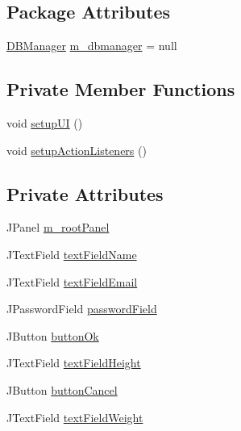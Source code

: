 \subsection*{Package Attributes}
\begin{DoxyCompactItemize}
\item 
\mbox{\hyperlink{classcom_1_1activitytracker_1_1_d_b_manager}{D\+B\+Manager}} \mbox{\hyperlink{classcom_1_1activitytracker_1_1_create_user_window_adab0a80c7975dfad1c2882a56f00a235}{m\+\_\+dbmanager}} = null
\end{DoxyCompactItemize}
\subsection*{Private Member Functions}
\begin{DoxyCompactItemize}
\item 
void \mbox{\hyperlink{classcom_1_1activitytracker_1_1_create_user_window_a41715d85194c6bb84cf6969f771940dc}{setup\+UI}} ()
\item 
void \mbox{\hyperlink{classcom_1_1activitytracker_1_1_create_user_window_a174a05a389ca6f3b7979ac9c5028a3ae}{setup\+Action\+Listeners}} ()
\end{DoxyCompactItemize}
\subsection*{Private Attributes}
\begin{DoxyCompactItemize}
\item 
J\+Panel \mbox{\hyperlink{classcom_1_1activitytracker_1_1_create_user_window_a5a678326afe519b6a2c9e7a2d9eff87c}{m\+\_\+root\+Panel}}
\item 
J\+Text\+Field \mbox{\hyperlink{classcom_1_1activitytracker_1_1_create_user_window_aa2b8cf1781a8a1534dbf5c5b98332c05}{text\+Field\+Name}}
\item 
J\+Text\+Field \mbox{\hyperlink{classcom_1_1activitytracker_1_1_create_user_window_a4f6010631cb7be5a2ae3691bdca31483}{text\+Field\+Email}}
\item 
J\+Password\+Field \mbox{\hyperlink{classcom_1_1activitytracker_1_1_create_user_window_a29be9c267c003ae90731199d8257dc0a}{password\+Field}}
\item 
J\+Button \mbox{\hyperlink{classcom_1_1activitytracker_1_1_create_user_window_aa22864c8baa65b46fe9a7621748d7841}{button\+Ok}}
\item 
J\+Text\+Field \mbox{\hyperlink{classcom_1_1activitytracker_1_1_create_user_window_ac5ce2bc2efbc06d578d93fb3f26aad1c}{text\+Field\+Height}}
\item 
J\+Button \mbox{\hyperlink{classcom_1_1activitytracker_1_1_create_user_window_a975a5cc35d145a3efa4d9e340776ca63}{button\+Cancel}}
\item 
J\+Text\+Field \mbox{\hyperlink{classcom_1_1activitytracker_1_1_create_user_window_ae84b4d977150419bfabc11fbd009392c}{text\+Field\+Weight}}
\end{DoxyCompactItemize}


